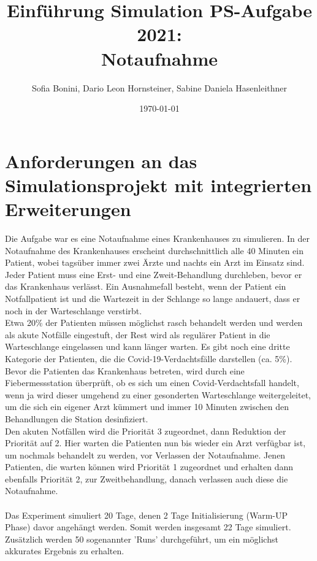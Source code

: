 \documentclass{article}
\title{Einführung Simulation PS-Aufgabe 2021:\\Notaufnahme}
\author{Sofia Bonini, Dario Leon Hornsteiner, Sabine Daniela Hasenleithner}
\date{\today}
\begin{document}
\maketitle

\section{Anforderungen an das Simulationsprojekt mit integrierten Erweiterungen}
Die Aufgabe war es eine Notaufnahme eines Krankenhauses zu simulieren. In der Notaufnahme des Krankenhauses erscheint durchschnittlich alle 40 Minuten ein Patient, wobei tagsüber immer zwei Ärzte und nachts ein Arzt im Einsatz sind. Jeder Patient muss eine Erst- und eine Zweit-Behandlung durchleben, bevor er das Krankenhaus verlässt. Ein Ausnahmefall besteht, wenn der Patient ein Notfallpatient ist und die Wartezeit in der Schlange so lange andauert, dass er noch in der Warteschlange verstirbt.\\
Etwa 20\% der Patienten müssen möglichst rasch behandelt werden und werden als akute Notfälle eingestuft, der Rest wird als regulärer Patient in die Warteschlange eingelassen und kann länger warten. Es gibt noch eine dritte Kategorie der Patienten, die die Covid-19-Verdachtsfälle darstellen (ca. 5\%). Bevor die Patienten das Krankenhaus betreten, wird durch eine Fiebermessstation überprüft, ob es sich um einen Covid-Verdachtsfall handelt, wenn ja wird dieser umgehend zu einer gesonderten Warteschlange weitergeleitet, um die sich ein eigener Arzt kümmert und immer 10 Minuten zwischen den Behandlungen die Station desinfiziert.\\
Den akuten Notfällen wird die Priorität 3 zugeordnet, dann Reduktion der Priorität auf 2. Hier warten die Patienten nun bis wieder ein Arzt verfügbar ist, um nochmals behandelt zu werden, vor Verlassen der Notaufnahme. Jenen Patienten, die warten können wird Priorität 1 zugeordnet und erhalten dann ebenfalls Priorität 2, zur Zweitbehandlung, danach verlassen auch diese die Notaufnahme.\\
\\
Das Experiment simuliert 20 Tage, denen 2 Tage Initialisierung (Warm-UP Phase) davor angehängt werden. Somit werden insgesamt 22 Tage simuliert. Zusätzlich werden 50 sogenannter 'Runs' durchgeführt, um ein möglichst akkurates Ergebnis zu erhalten.\\
\end{document}
